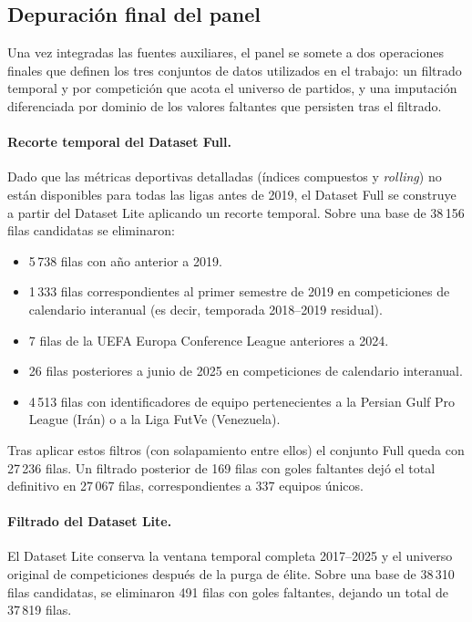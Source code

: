 \subsection{Depuraci\'on final del panel}
\label{subsec:filtrado}
\label{subsec:imputacion}

Una vez integradas las fuentes auxiliares, el panel se somete a dos operaciones finales que definen los tres conjuntos de datos utilizados en el trabajo: un filtrado temporal y por competici\'on que acota el universo de partidos, y una imputaci\'on diferenciada por dominio de los valores faltantes que persisten tras el filtrado.

\paragraph{Recorte temporal del Dataset Full.} Dado que las m\'etricas deportivas detalladas (\'indices compuestos y \textit{rolling}) no est\'an disponibles para todas las ligas antes de 2019, el Dataset Full se construye a partir del Dataset Lite aplicando un recorte temporal. Sobre una base de 38\,156 filas candidatas se eliminaron:
\begin{itemize}
	\item 5\,738 filas con a\~no anterior a 2019.
	\item 1\,333 filas correspondientes al primer semestre de 2019 en competiciones de calendario interanual (es decir, temporada 2018--2019 residual).
	\item 7 filas de la UEFA Europa Conference League anteriores a 2024.
	\item 26 filas posteriores a junio de 2025 en competiciones de calendario interanual.
	\item 4\,513 filas con identificadores de equipo pertenecientes a la Persian Gulf Pro League (Ir\'an) o a la Liga FutVe (Venezuela).
\end{itemize}
Tras aplicar estos filtros (con solapamiento entre ellos) el conjunto Full queda con 27\,236 filas. Un filtrado posterior de 169 filas con goles faltantes dej\'o el total definitivo en 27\,067 filas, correspondientes a 337 equipos \'unicos.

\paragraph{Filtrado del Dataset Lite.} El Dataset Lite conserva la ventana temporal completa 2017--2025 y el universo original de competiciones despu\'es de la purga de \'elite. Sobre una base de 38\,310 filas candidatas, se eliminaron 491 filas con goles faltantes, dejando un total de 37\,819 filas.

